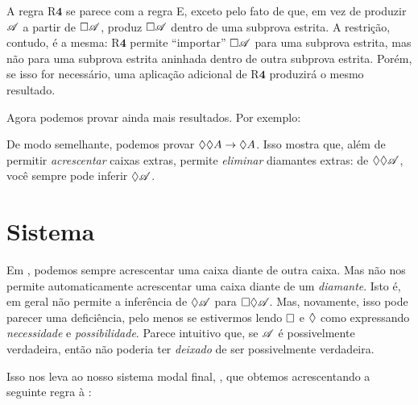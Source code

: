 A regra R$\mathbf{4}$ se parece com a regra {\ebox}E, exceto pelo fato de que, em vez de produzir $\mathscr{A}$ a partir de $\Box\mathscr{A}$, produz $\Box\mathscr{A}$ dentro de uma subprova estrita. A restrição, contudo, é a mesma: R$\mathbf{4}$ permite \textquotedblleft importar\textquotedblright{} $\Box \mathscr{A}$ para uma subprova estrita, mas não para uma subprova estrita aninhada dentro de outra subprova estrita. Porém, se isso for necessário, uma aplicação adicional de R$\mathbf{4}$ produzirá o mesmo resultado.

Agora podemos provar ainda mais resultados. Por exemplo:
\begin{fitchproof}
	\open
	\AS
	\open
	\AS
	\close
	\close
\end{fitchproof}
De modo semelhante, podemos provar $\Diamond\Diamond A \rightarrow \Diamond A$. Isso mostra que, além de permitir \emph{acrescentar} caixas extras, \mlSfour{} permite \emph{eliminar} diamantes extras: de $\Diamond\Diamond \mathscr{A}$, você sempre pode inferir $\Diamond\mathscr{A}$.

\section{Sistema \mlSfive}
\label{S5}

Em \mlSfour, podemos sempre acrescentar uma caixa diante de outra caixa. Mas \mlSfour{} não nos permite automaticamente acrescentar uma caixa diante de um \emph{diamante}. Isto é, \mlSfour{} em geral não permite a inferência de $\Diamond\mathscr{A}$ para $\Box\Diamond\mathscr{A}$. Mas, novamente, isso pode parecer uma deficiência, pelo menos se estivermos lendo $\Box$ e $\Diamond$ como expressando \emph{necessidade} e \emph{possibilidade}. Parece intuitivo que, se $\mathscr{A}$ é possivelmente verdadeira, então não poderia ter \emph{deixado} de ser possivelmente verdadeira.

Isso nos leva ao nosso sistema modal final, \mlSfive, que obtemos acrescentando a seguinte regra à \mlSfour:

